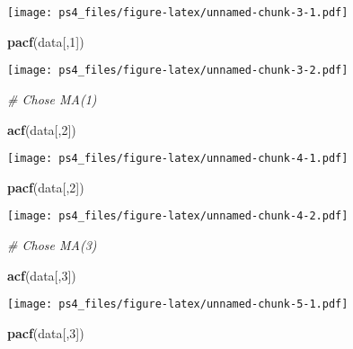 \documentclass[
]{article}
\newenvironment{Shaded}{\begin{snugshade}}{\end{snugshade}}
\newcommand{\CommentTok}[1]{\textcolor[rgb]{0.56,0.35,0.01}{\textit{#1}}}
\newcommand{\DecValTok}[1]{\textcolor[rgb]{0.00,0.00,0.81}{#1}}
\newcommand{\KeywordTok}[1]{\textcolor[rgb]{0.13,0.29,0.53}{\textbf{#1}}}
\newcommand{\NormalTok}[1]{#1}
\begin{document}
\texttt{[image: ps4\_files/figure-latex/unnamed-chunk-3-1.pdf]}

\begin{Shaded}
\begin{Highlighting}[]
\KeywordTok{pacf}\NormalTok{(data[,}\DecValTok{1}\NormalTok{])}
\end{Highlighting}
\end{Shaded}

\texttt{[image: ps4\_files/figure-latex/unnamed-chunk-3-2.pdf]}

\begin{Shaded}
\begin{Highlighting}[]
\CommentTok{# Chose MA(1)}
\end{Highlighting}
\end{Shaded}

\begin{Shaded}
\begin{Highlighting}[]
\KeywordTok{acf}\NormalTok{(data[,}\DecValTok{2}\NormalTok{])}
\end{Highlighting}
\end{Shaded}

\texttt{[image: ps4\_files/figure-latex/unnamed-chunk-4-1.pdf]}

\begin{Shaded}
\begin{Highlighting}[]
\KeywordTok{pacf}\NormalTok{(data[,}\DecValTok{2}\NormalTok{])}
\end{Highlighting}
\end{Shaded}

\texttt{[image: ps4\_files/figure-latex/unnamed-chunk-4-2.pdf]}

\begin{Shaded}
\begin{Highlighting}[]
\CommentTok{# Chose MA(3)}
\end{Highlighting}
\end{Shaded}

\begin{Shaded}
\begin{Highlighting}[]
\KeywordTok{acf}\NormalTok{(data[,}\DecValTok{3}\NormalTok{])}
\end{Highlighting}
\end{Shaded}

\texttt{[image: ps4\_files/figure-latex/unnamed-chunk-5-1.pdf]}

\begin{Shaded}
\begin{Highlighting}[]
\KeywordTok{pacf}\NormalTok{(data[,}\DecValTok{3}\NormalTok{])}
\end{Highlighting}
\end{Shaded}
\end{document}
